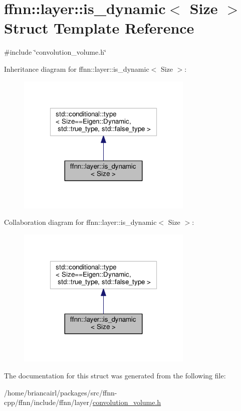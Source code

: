 \hypertarget{structffnn_1_1layer_1_1is__dynamic}{\section{ffnn\-:\-:layer\-:\-:is\-\_\-dynamic$<$ Size $>$ Struct Template Reference}
\label{structffnn_1_1layer_1_1is__dynamic}
}


{\ttfamily \#include \char`\"{}convolution\-\_\-volume.\-h\char`\"{}}



Inheritance diagram for ffnn\-:\-:layer\-:\-:is\-\_\-dynamic$<$ Size $>$\-:
\nopagebreak
\begin{figure}[H]
\begin{center}
\leavevmode
\includegraphics[width=238pt]{structffnn_1_1layer_1_1is__dynamic__inherit__graph}
\end{center}
\end{figure}


Collaboration diagram for ffnn\-:\-:layer\-:\-:is\-\_\-dynamic$<$ Size $>$\-:
\nopagebreak
\begin{figure}[H]
\begin{center}
\leavevmode
\includegraphics[width=238pt]{structffnn_1_1layer_1_1is__dynamic__coll__graph}
\end{center}
\end{figure}


The documentation for this struct was generated from the following file\-:\begin{DoxyCompactItemize}
\item 
/home/briancairl/packages/src/ffnn-\/cpp/ffnn/include/ffnn/layer/\hyperlink{convolution__volume_8h}{convolution\-\_\-volume.\-h}\end{DoxyCompactItemize}
